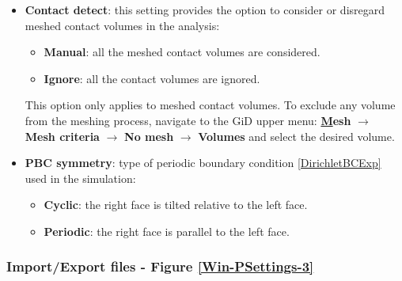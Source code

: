 \begin{itemize}
	\quad
	\item \textbf{Contact detect}: this setting provides the option to consider or disregard meshed contact volumes in the analysis:
    \begin{itemize}\itemsep0em 
	    \item \textbf{Manual}: all the meshed contact volumes are considered.
	    \item \textbf{Ignore}: all the contact volumes are ignored.
    \end{itemize}
    This option only applies to meshed contact volumes. To exclude any volume from the meshing process, navigate to the GiD upper menu: \textbf{\underline{M}esh} $\rightarrow$ \textbf{Mesh criteria} $\rightarrow$ \textbf{No mesh} $\rightarrow$ \textbf{Volumes} and select the desired volume.
	\quad
	\item \textbf{PBC symmetry}: type of periodic boundary condition \ref{DirichletBCExp} used in the simulation: 
    \begin{itemize}\itemsep0em 
	    \item \textbf{Cyclic}: the right face is tilted relative to the left face.
	    \item \textbf{Periodic}: the right face is parallel to the left face.
    \end{itemize}		
\end{itemize}

\subsubsection{Import/Export files - Figure \ref{Win-PSettings-3}}\label{ImportExportSettings}

